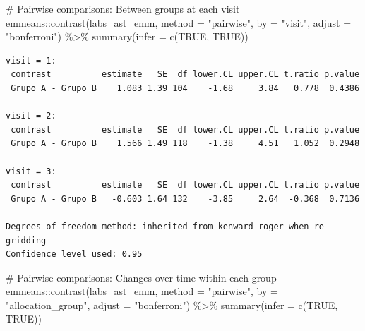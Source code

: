 \documentclass[
  letterpaper,
  DIV=11,
  numbers=noendperiod]{scrartcl}
\newenvironment{Shaded}{\begin{snugshade}}{\end{snugshade}}
\newcommand{\AttributeTok}[1]{\textcolor[rgb]{0.40,0.45,0.13}{#1}}
\newcommand{\CommentTok}[1]{\textcolor[rgb]{0.37,0.37,0.37}{#1}}
\newcommand{\ConstantTok}[1]{\textcolor[rgb]{0.56,0.35,0.01}{#1}}
\newcommand{\FunctionTok}[1]{\textcolor[rgb]{0.28,0.35,0.67}{#1}}
\newcommand{\NormalTok}[1]{\textcolor[rgb]{0.00,0.23,0.31}{#1}}
\newcommand{\SpecialCharTok}[1]{\textcolor[rgb]{0.37,0.37,0.37}{#1}}
\newcommand{\StringTok}[1]{\textcolor[rgb]{0.13,0.47,0.30}{#1}}
\begin{document}
\begin{Shaded}
\begin{Highlighting}[]
\CommentTok{\# Pairwise comparisons: Between groups at each visit}
\NormalTok{emmeans}\SpecialCharTok{::}\FunctionTok{contrast}\NormalTok{(labs\_ast\_emm, }\AttributeTok{method =} \StringTok{"pairwise"}\NormalTok{, }\AttributeTok{by =} \StringTok{"visit"}\NormalTok{, }\AttributeTok{adjust =} \StringTok{"bonferroni"}\NormalTok{) }\SpecialCharTok{\%\textgreater{}\%} \FunctionTok{summary}\NormalTok{(}\AttributeTok{infer =} \FunctionTok{c}\NormalTok{(}\ConstantTok{TRUE}\NormalTok{, }\ConstantTok{TRUE}\NormalTok{))}
\end{Highlighting}
\end{Shaded}

\begin{verbatim}
visit = 1:
 contrast          estimate   SE  df lower.CL upper.CL t.ratio p.value
 Grupo A - Grupo B    1.083 1.39 104    -1.68     3.84   0.778  0.4386

visit = 2:
 contrast          estimate   SE  df lower.CL upper.CL t.ratio p.value
 Grupo A - Grupo B    1.566 1.49 118    -1.38     4.51   1.052  0.2948

visit = 3:
 contrast          estimate   SE  df lower.CL upper.CL t.ratio p.value
 Grupo A - Grupo B   -0.603 1.64 132    -3.85     2.64  -0.368  0.7136

Degrees-of-freedom method: inherited from kenward-roger when re-gridding 
Confidence level used: 0.95 
\end{verbatim}

\begin{Shaded}
\begin{Highlighting}[]
\CommentTok{\# Pairwise comparisons: Changes over time within each group}
\NormalTok{emmeans}\SpecialCharTok{::}\FunctionTok{contrast}\NormalTok{(labs\_ast\_emm, }\AttributeTok{method =} \StringTok{"pairwise"}\NormalTok{, }\AttributeTok{by =} \StringTok{"allocation\_group"}\NormalTok{, }\AttributeTok{adjust =} \StringTok{"bonferroni"}\NormalTok{) }\SpecialCharTok{\%\textgreater{}\%} \FunctionTok{summary}\NormalTok{(}\AttributeTok{infer =} \FunctionTok{c}\NormalTok{(}\ConstantTok{TRUE}\NormalTok{, }\ConstantTok{TRUE}\NormalTok{))}
\end{Highlighting}
\end{Shaded}
\end{document}
